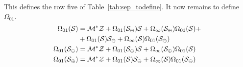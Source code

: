 \documentclass[12pt, a4paper, twoside]{report}
\begin{document}
This defines the row five of Table~\ref{tab:sep_todefine}. It now remains to define $\Omega_{01}$. 
\begin{align}
  \begin{aligned}
    \Omega_{01}(\S) %
    &= \Mstar\Z + \Omega_{01}(\S_\oplus)\S + \Omega_\infty(\S_\oplus)\Omega_{01}(\S) +\\
    &+\Omega_{01}(\S)\S_\ominus + \Omega_\infty(\S)\Omega_{01}(\S_\ominus)\\
    \Omega_{01}(\S_\ominus) %
    &= \Mstar\Z + \Omega_{01}(\S_\oplus)\S + \Omega_\infty(\S_\oplus)\Omega_{01}(\S)\\
    \Omega_{01}(\S_\oplus) %
    &= \Mstar\Z + \Omega_{01}(\S)\S_\ominus + \Omega_\infty(\S)\Omega_{01}(\S_\ominus)
  \end{aligned}
\end{align}
\end{document}
